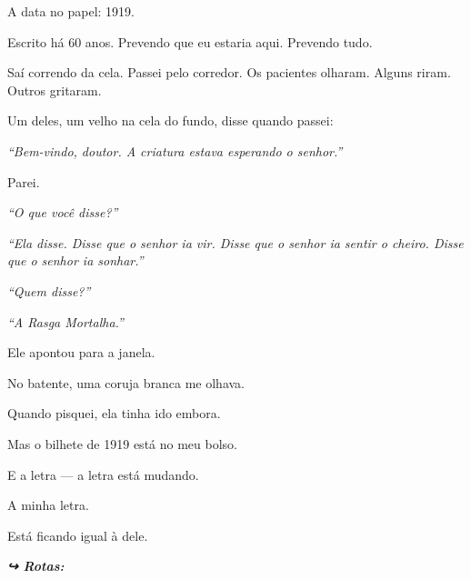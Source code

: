 \noindent A data no papel: 1919.

\noindent Escrito há 60 anos.
Prevendo que eu estaria aqui.
Prevendo tudo.

\noindent Saí correndo da cela. Passei pelo corredor. Os pacientes olharam. Alguns riram. Outros gritaram.

\noindent Um deles, um velho na cela do fundo, disse quando passei:

\noindent \textit{\textquotedblleft{}Bem-vindo, doutor. A criatura estava esperando o senhor.\textquotedblright{}}

\noindent Parei.

\noindent \textit{\textquotedblleft{}O que você disse?\textquotedblright{}}

\noindent \textit{\textquotedblleft{}Ela disse. Disse que o senhor ia vir. Disse que o senhor ia sentir o cheiro. Disse que o senhor ia sonhar.\textquotedblright{}}

\noindent \textit{\textquotedblleft{}Quem disse?\textquotedblright{}}

\noindent \textit{\textquotedblleft{}A Rasga Mortalha.\textquotedblright{}}

\noindent Ele apontou para a janela.

\noindent No batente, uma coruja branca me olhava.

\noindent Quando pisquei, ela tinha ido embora.

\noindent Mas o bilhete de 1919 está no meu bolso.

\noindent E a letra --- a letra está mudando.

\noindent A minha letra.

\noindent Está ficando igual à dele.

\vspace{0.5em}
\noindent\textit{\textbf{↪ Rotas:}  \rotasep {} \rotasep {}}